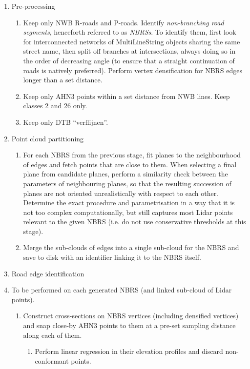 \begin{enumerate}
    \item Pre-processing
    \begin{enumerate}
        \item Keep only NWB R-roads and P-roads. Identify \textit{non-branching road segments}, henceforth referred to as \textit{NBRSs}. To identify them, first look for interconnected networks of MultiLineString objects sharing the same street name, then split off branches at intersections, always doing so in the order of decreasing angle (to ensure that a straight continuation of roads is natively preferred). Perform vertex densification for NBRS edges longer than a set distance.
        \item Keep only AHN3 points within a set distance from NWB lines. Keep classes 2 and 26 only.
        \item Keep only DTB “verflijnen”.
    \end{enumerate}
    \item Point cloud partitioning
    \begin{enumerate}
        \item For each NBRS from the previous stage, fit planes to the neighbourhood of edges and fetch points that are close to them. When selecting a final plane from candidate planes, perform a similarity check between the parameters of neighbouring planes, so that the resulting succession of planes are not oriented unrealistically with respect to each other. Determine the exact procedure and parametrisation in a way that it is not too complex computationally, but still captures most Lidar points relevant to the given NBRS (i.e. do not use conservative thresholds at this stage).
        \item Merge the sub-clouds of edges into a single sub-cloud for the NBRS and save to disk with an identifier linking it to the NBRS itself.
    \end{enumerate}
    \item Road edge identification
    \item[] To be performed on each generated NBRS (and linked sub-cloud of Lidar points).
        \begin{enumerate}
            \item Construct cross-sections on NBRS vertices (including densified vertices) and snap close-by AHN3 points to them at a pre-set sampling distance along each of them.
            \begin{enumerate}
                \item Perform linear regression in their elevation profiles and discard non-conformant points.

\end{enumerate}
\end{enumerate}
\end{enumerate}
